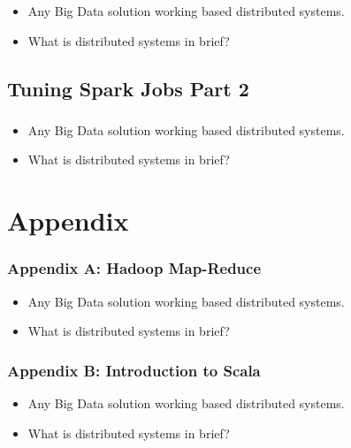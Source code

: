 \begin{frame}
  \frametitle{\subsecname}
	\begin{itemize}[<+->]
		\item Any Big Data solution working based distributed systems.
		\item What is distributed systems in brief?
	\end{itemize}
\end{frame}

\subsection{Tuning Spark Jobs Part 2}

\begin{frame}
  \frametitle{\subsecname}
	\begin{itemize}[<+->]
		\item Any Big Data solution working based distributed systems.
		\item What is distributed systems in brief?
	\end{itemize}
\end{frame}

\section{Appendix}


\begin{frame}
  \frametitle{Appendix A: Hadoop Map-Reduce}
	\begin{itemize}[<+->]
		\item Any Big Data solution working based distributed systems.
		\item What is distributed systems in brief?
	\end{itemize}
\end{frame}


\begin{frame}
  \frametitle{Appendix B: Introduction to Scala}
	\begin{itemize}[<+->]
		\item Any Big Data solution working based distributed systems.
		\item What is distributed systems in brief?
	\end{itemize}
\end{frame}

